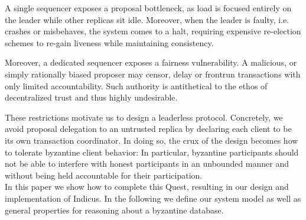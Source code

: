 A single sequencer exposes a proposal bottleneck, as load is focused entirely on the leader while other replicas sit idle. Moreover, when the leader is faulty, i.e. crashes or misbehaves, the system comes to a halt, requiring expensive re-election schemes to re-gain liveness while maintaining consistency. 

Moreover, a dedicated sequencer exposes a fairness vulnerability. A malicious, or simply rationally biased proposer may censor, delay or frontrun transactions with only limited accountability. Such authority is antithetical to the ethos of decentralized trust and thus highly undesirable. 

These restrictions motivate us to design a leaderless protocol. Concretely, we avoid proposal delegation to an untrusted replica by declaring each client to be its own transaction coordinator.
In doing so, the crux of the design becomes how to tolerate byzantine client behavior: In particular, byzantine participants should not be able to interfere with honest participants in an unbounded manner and without being held accountable for their participation. \\


In this paper we show how to complete this Quest, resulting in our design and implementation of Indicus. In the following we define our system model as well as general properties for reasoning about a byzantine database.